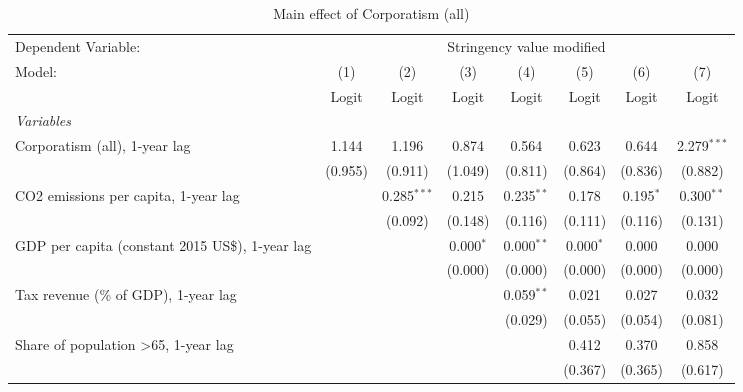 
\begin{table}[htbp]
   \caption{Main effect of Corporatism (all)}
   \centering
   \begin{tabular}{lccccccc}
      \toprule
      Dependent Variable: & \multicolumn{7}{c}{Stringency value modified}\\
      Model:                                                & (1)     & (2)           & (3)         & (4)          & (5)         & (6)         & (7)\\  
                                                            &  Logit  & Logit         & Logit       & Logit        & Logit       & Logit       & Logit\\  
      \midrule
      \emph{Variables}\\
      Corporatism (all), 1-year lag                         & 1.144   & 1.196         & 0.874       & 0.564        & 0.623       & 0.644       & 2.279$^{***}$\\   
                                                            & (0.955) & (0.911)       & (1.049)     & (0.811)      & (0.864)     & (0.836)     & (0.882)\\   
      CO2 emissions per capita, 1-year lag                  &         & 0.285$^{***}$ & 0.215       & 0.235$^{**}$ & 0.178       & 0.195$^{*}$ & 0.300$^{**}$\\   
                                                            &         & (0.092)       & (0.148)     & (0.116)      & (0.111)     & (0.116)     & (0.131)\\   
      GDP per capita (constant 2015 US\$), 1-year lag       &         &               & 0.000$^{*}$ & 0.000$^{**}$ & 0.000$^{*}$ & 0.000       & 0.000\\   
                                                            &         &               & (0.000)     & (0.000)      & (0.000)     & (0.000)     & (0.000)\\   
      Tax revenue (\% of GDP), 1-year lag                   &         &               &             & 0.059$^{**}$ & 0.021       & 0.027       & 0.032\\   
                                                            &         &               &             & (0.029)      & (0.055)     & (0.054)     & (0.081)\\   
      Share of population >65, 1-year lag                   &         &               &             &              & 0.412       & 0.370       & 0.858\\   
                                                            &         &               &             &              & (0.367)     & (0.365)     & (0.617)\\   

\end{tabular}
\end{table}
